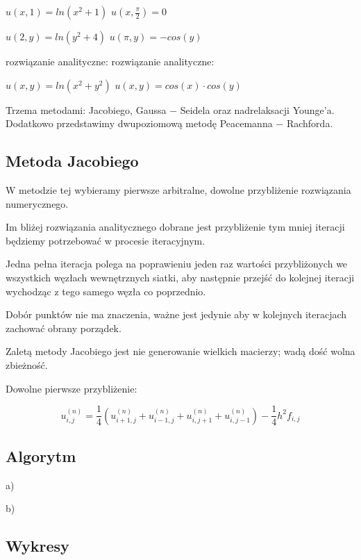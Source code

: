 $u(x,1) = ln(x^2 + 1)$ \hspace{3.28cm} $u(x,\frac{\pi}{2}) = 0$

$u(2,y) = ln(y^2 + 4)$ \hspace{3.3cm} $u(\pi,y) = -cos(y)$

rozwiązanie analityczne: \hspace{2.6cm} rozwiązanie analityczne:

$u(x,y) = ln(x^2 + y^2)$ \hspace{3.1cm} $u(x,y) = cos(x)\cdot cos(y)$

\vspace{0.5cm}

Trzema metodami: Jacobiego, Gaussa $-$ Seidela oraz nadrelaksacji Younge'a. Dodatkowo przedstawimy dwupoziomową metodę Peacemanna $-$ Rachforda.

\subsection{Metoda Jacobiego}

W metodzie tej wybieramy pierwsze arbitralne, dowolne przybliżenie rozwiązania numerycznego.

Im bliżej rozwiązania analitycznego dobrane jest przybliżenie tym mniej iteracji będziemy potrzebować w procesie iteracyjnym.

Jedna pełna iteracja polega na poprawieniu jeden raz wartości przybliżonych we wszystkich węzłach wewnętrznych siatki, aby następnie przejść do kolejnej iteracji wychodząc z tego samego węzła co poprzednio.

Dobór punktów nie ma znaczenia, ważne jest jedynie aby w kolejnych iteracjach zachować obrany porządek.

Zaletą metody Jacobiego jest nie generowanie wielkich macierzy; wadą dość wolna zbieżność.

Dowolne pierwsze przybliżenie:

$$u_{i,j}^{(n)} = \frac{1}{4}(u_{i+1,j}^{(n)} + u_{i-1,j}^{(n)} + u_{i,j+1}^{(n)} + u_{i,j-1}^{(n)}) - \frac{1}{4}h^2f_{i,j}$$

\subsection{Algorytm}

a)


\newpage
b)


\newpage
\subsection{Wykresy}

